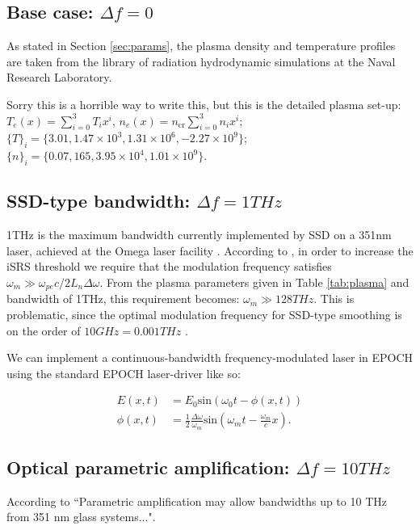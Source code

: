 \subsection{Base case: $\Delta f=0$}
As stated in Section \ref{sec:params}, the plasma density and temperature profiles are taken from the library of radiation hydrodynamic simulations at the Naval Research Laboratory. 

Sorry this is a horrible way to write this, but this is the detailed plasma set-up: $T_e(x) = \sum^3_{i=0} T_i x^i$, $n_e(x) = n_{\mathrm{cr}}\sum^3_{i=0} n_i x^i $;
$\{T\}_i  = \{3.01, 1.47\times10^3,1.31\times10^6,-2.27\times10^9\}$;
$\{n\}_i  = \{0.07, 165, 3.95\times10^4, 1.01\times10^9\}$. 



\subsection{SSD-type bandwidth: $\Delta f=1\si{THz}$}
1THz is the maximum bandwidth currently implemented by SSD on a 351nm laser, achieved at the Omega laser facility \citep{Regan2005}. According to \citet{Wen2021}, in order to increase the iSRS threshold we require that the modulation frequency satisfies $\omega_m \gg \omega_{pe} c / 2L_n\Delta\omega$. From the plasma parameters given in Table \ref{tab:plasma} and bandwidth of 1THz, this requirement becomes: $\omega_m \gg 128  \si{THz}$. This is problematic, since the optimal modulation frequency for SSD-type smoothing is on the order of $10 \si{GHz} = 0.001 \si{THz}$ \citep{Regan2005,Kelly2013}.

We can implement a continuous-bandwidth frequency-modulated laser in EPOCH using the standard EPOCH laser-driver like so:

\begin{equation}
\begin{aligned}
   E(x,t) &= E_0\text{sin}\left(\omega_0 t - \phi(x,t)\right) \\
   \phi(x,t) &= \frac{1}{2}\frac{\Delta\omega}{\omega_m}\text{sin}\left(\omega_mt - \frac{\omega_m}{c}x\right).
\end{aligned}
\end{equation}

\subsection{Optical parametric amplification: $\Delta f=10\si{THz}$}
According to \citet{Lehmberg2020} ``Parametric amplification may allow bandwidths up to 10 THz from 351 nm glass systems...".



